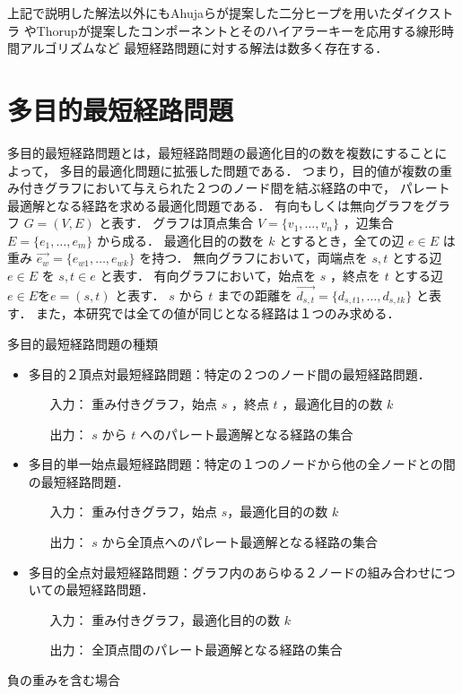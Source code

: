 \documentclass[12pt]{optlab-bachelor}
\begin{document}
上記で説明した解法以外にもAhujaら\cite{Ahuja}が提案した二分ヒープを用いたダイクストラ
やThorup\cite{Thorup}が提案したコンポーネントとそのハイアラーキーを応用する線形時間アルゴリズムなど
最短経路問題に対する解法は数多く存在する．

\section{多目的最短経路問題}
多目的最短経路問題とは，最短経路問題の最適化目的の数を複数にすることによって，
多目的最適化問題に拡張した問題である．
つまり，目的値が複数の重み付きグラフにおいて与えられた２つのノード間を結ぶ経路の中で，
パレート最適解となる経路を求める最適化問題である．
有向もしくは無向グラフをグラフ $G=(V,E)$ と表す．
グラフは頂点集合 $V=\{v_1,\ldots,v_n\}$ ，辺集合 $E=\{e_1,\ldots,e_m\}$ から成る．
最適化目的の数を $k$ とするとき，全ての辺 $e\in E$ は重み $\vec{e_w} = \{e_{w1},\ldots,e_{wk}\}$ を持つ．
無向グラフにおいて，両端点を $s,t$ とする辺 $e \in E$ を $s,t \in e$ と表す．
有向グラフにおいて，始点を $s$ ，終点を $t$ とする辺 $e \in E$を$e=(s,t)$ と表す．
$s$ から $t$ までの距離を $\vec{d_{s,t}} = \{d_{s,t1},\ldots,d_{s,tk}\}$ と表す．
また，本研究では全ての値が同じとなる経路は１つのみ求める．
\begin{description}
  \item[多目的最短経路問題の種類]
\end{description}
\begin{itemize}
\item 多目的２頂点対最短経路問題：特定の２つのノード間の最短経路問題．
  \begin{itemize}
    \item[入力：]重み付きグラフ，始点 $s$ ，終点 $t$ ，最適化目的の数 $k$
    \item[出力：]$s$ から $t$ へのパレート最適解となる経路の集合
  \end{itemize}
  \item 多目的単一始点最短経路問題：特定の１つのノードから他の全ノードとの間の最短経路問題．
  \begin{itemize}
    \item[入力：]重み付きグラフ，始点 $s$，最適化目的の数 $k$
    \item[出力：]$s$ から全頂点へのパレート最適解となる経路の集合
  \end{itemize}
  \item 多目的全点対最短経路問題：グラフ内のあらゆる２ノードの組み合わせについての最短経路問題．
  \begin{itemize}
    \item[入力：]重み付きグラフ，最適化目的の数 $k$
    \item[出力：]全頂点間のパレート最適解となる経路の集合
  \end{itemize}
\end{itemize}
\begin{description}
  \item[負の重みを含む場合]
\end{description}
\end{document}
